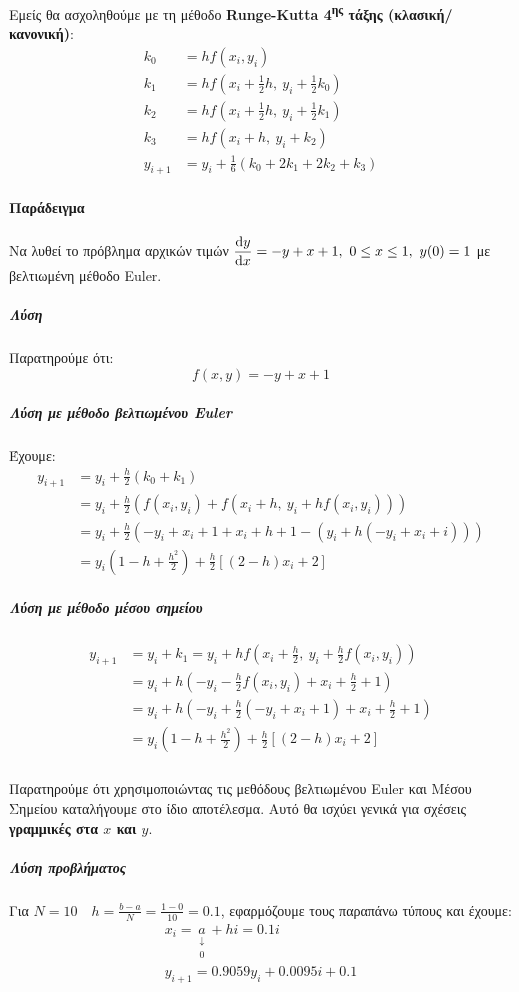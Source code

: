 \documentclass[11pt,a4paper,notitlepage,fleqn,final]{article}
\begin{document}
Εμείς θα ασχοληθούμε με τη μέθοδο \textbf{Runge-Kutta 4\textsuperscript{ης}
τάξης (κλασική/κανονική)}:
\[
\boxed{\begin{array}{rl}
	k_0 &= hf(x_i,y_i) \\
	k_1 &= hf(x_i+\frac{1}{2}h,\ y_i + \frac{1}{2}k_0) \\
	k_2 &= hf(x_i+\frac{1}{2}h,\ y_i+\frac{1}{2}k_1) \\
	k_3 &= hf(x_i+h,\ y_i+k_2) \\
	y_{i+1} &= \boxed{y_i+\frac{1}{6}\left(k_0+2k_1+2k_2+k_3\right)}
	\end{array}}
\]

\paragraph{Παράδειγμα}
Να λυθεί το πρόβλημα αρχικών τιμών \( \displaystyle
\od{y}{x} = -y+x+1,\ 0\leq x \leq 1,\ y(0)=1
 \) με βελτιωμένη μέθοδο Euler.
\subparagraph{Λύση}
Παρατηρούμε ότι:
\[
f(x,y) = -y+x+1
\]

\subparagraph{Λύση με μέθοδο βελτιωμένου Euler}
Έχουμε:
\begin{align*}
	y_{i+1} &= y_i +\frac{h}{2}(k_0+k_1)
	\\ &= y_i+\frac{h}{2}\left(
	f(x_i,y_i) + f\left( x_i+h,\ y_i+hf(x_i,y_i) \right)
	\right)
	\\ &= y_i + \frac{h}{2}\left(-y_i+x_i+1
	+x_i+h+1-\left(
	y_i+h(-y_i+x_i+i)
	\right)\right)
	\\ &=
	y_i\left(1-h+\frac{h^2}{2}\right) + \frac{h}{2}\left[
	(2-h)x_i+2
	\right] \end{align*}

\subparagraph{Λύση με μέθοδο μέσου σημείου}
	\begin{align*}
	y_{i+1} &= y_i+k_1 = y_i+hf\left(x_i+\frac{h}{2},
	\ y_i+\frac{h}{2}f(x_i,y_i)\right)
	\\ &= y_i+h\left(-y_i-\frac{h}{2}f(x_i,y_i)+x_i+\frac{h}{2}+1\right)
	\\ &= y_i +
	h\left(-y_i+\frac{h}{2}(-y_i+x_i+1)+x_i+\frac{h}{2}+1\right)
	\\ &= y_i\left(1-h+\frac{h^2}{2}\right)+\frac{h}{2}\left[
	(2-h)x_i+2
	\right]
\end{align*}

\subparagraph{}
Παρατηρούμε ότι χρησιμοποιώντας τις μεθόδους βελτιωμένου Euler και Μέσου
Σημείου καταλήγουμε στο ίδιο αποτέλεσμα. Αυτό θα ισχύει γενικά για
σχέσεις \textbf{γραμμικές στα \( x \) και \( y \)}.

\subparagraph{Λύση προβλήματος}
Για \( N=10\quad h= \frac{b-a}{N}=\frac{1-0}{10}=0.1 \), εφαρμόζουμε τους παραπάνω τύπους
και έχουμε:
\begin{gather*}
x_i = \underset{\substack{\downarrow\\ 0}}{a}+hi=0.1i \\
y_{i+1} = 0.9059y_i + 0.0095i + 0.1
\end{gather*}
\end{document}
